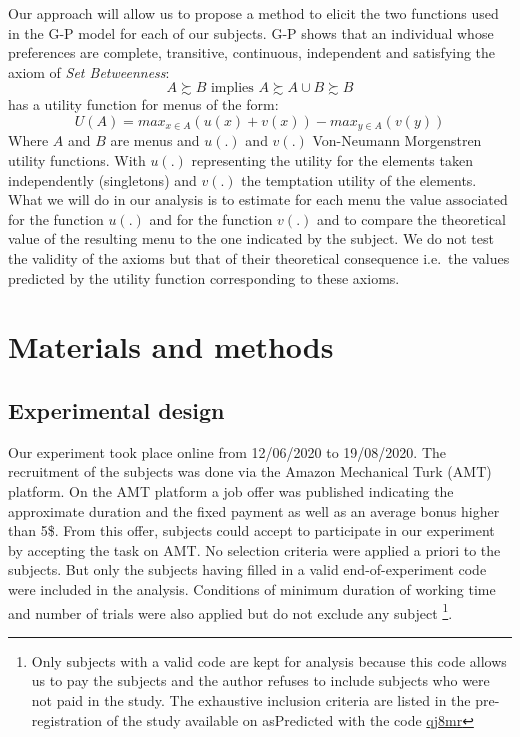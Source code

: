 \documentclass[
]{book}
\begin{document}
Our approach will allow us to propose a method to elicit the two
functions used in the G-P model for each of our subjects.
G-P shows that an individual whose preferences are complete, transitive,
continuous, independent and satisfying the axiom of \emph{Set Betweenness}:
\[
A \succsim B \text{ implies } A \succsim A\cup B \succsim B
\]
has a utility function for menus of the form:
\[
U(A) = max_{x \in A}(u(x) + v(x)) - max_{y \in A}(v(y))
\]
Where \(A\) and \(B\) are menus and \(u(.)\) and \(v(.)\) Von-Neumann Morgenstren
utility functions.
With \(u(.)\) representing the utility for the elements taken independently
(singletons) and \(v(.)\) the temptation utility of the elements.
What we will do in our analysis is to estimate for each menu the value
associated for the function \(u(.)\) and for the function \(v(.)\) and to compare
the theoretical value of the resulting menu to the one indicated by the subject.
We do not test the validity of the axioms but that of their theoretical
consequence i.e.~the values predicted by the utility function corresponding to
these axioms.

\hypertarget{mm3}{%
\section{Materials and methods}\label{mm3}}

\hypertarget{experimental-design}{%
\subsection{Experimental design}\label{experimental-design}}

Our experiment took place online from 12/06/2020 to 19/08/2020.
The recruitment of the subjects was done via the Amazon
Mechanical Turk (AMT) platform.
On the AMT platform a job offer was published indicating the approximate
duration and the fixed payment as well as an average bonus higher than 5\$.
From this offer, subjects could accept to participate in our experiment by
accepting the task on AMT.
No selection criteria were applied a priori to the subjects. But only the subjects having filled in a valid end-of-experiment code were included in the analysis. Conditions of minimum duration of working time and number of trials were also applied but do not exclude any subject \footnote{Only subjects with a valid code are kept for analysis because this code allows us to pay the subjects and the author refuses to include subjects who were not paid in the study. The exhaustive inclusion criteria are listed in the pre-registration of the study available on asPredicted with the code
  \href{https://aspredicted.org/qj8mr.pdf}{qj8mr}}.
\end{document}
